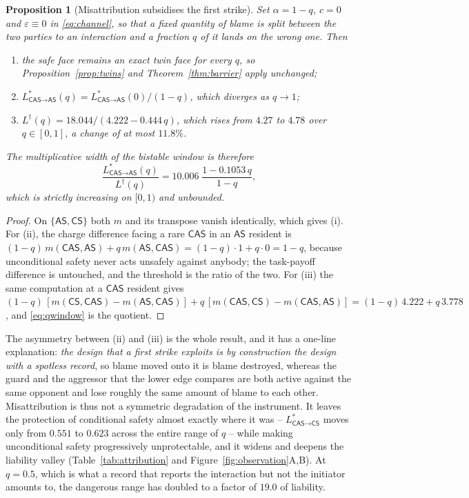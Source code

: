 \documentclass[11pt,a4paper]{article}
\newtheorem{proposition}[theorem]{Proposition}
\theoremstyle{definition}
\newcommand{\AS}{\textsf{AS}}
\newcommand{\CS}{\textsf{CS}}
\newcommand{\CAS}{\textsf{CAS}}
\begin{document}
\begin{proposition}[Misattribution subsidises the first strike]
\label{prop:misattr}
Set $\alpha=1-q$, $c=0$ and $\varepsilon\equiv0$ in \eqref{eq:channel}, so
that a fixed quantity of blame is split between the two parties to an
interaction and a fraction $q$ of it lands on the wrong one. Then
\begin{enumerate}
\item[(i)] the safe face remains an exact twin face for every $q$, so
Proposition~\ref{prop:twins} and Theorem~\ref{thm:barrier} apply unchanged;
\item[(ii)] $L^{*}_{\CAS\to\AS}(q)=L^{*}_{\CAS\to\AS}(0)/(1-q)$, which
diverges as $q\to1$;
\item[(iii)] $L^{\dagger}(q)=18.044/(4.222-0.444\,q)$, which rises from
$4.27$ to $4.78$ over $q\in[0,1]$, a change of at most $11.8\%$.
\end{enumerate}
The multiplicative width of the bistable window is therefore
\begin{equation}
\frac{L^{*}_{\CAS\to\AS}(q)}{L^{\dagger}(q)}
  =10.006\;\frac{1-0.1053\,q}{1-q},
\label{eq:qwindow}
\end{equation}
which is strictly increasing on $[0,1)$ and unbounded.
\end{proposition}

\begin{proof}
On $\{\AS,\CS\}$ both $m$ and its transpose vanish identically, which gives
(i). For (ii), the charge difference facing a rare $\CAS$ in an $\AS$ resident
is $(1-q)\,m(\CAS,\AS)+q\,m(\AS,\CAS)=(1-q)\cdot1+q\cdot0=1-q$, because
unconditional safety never acts unsafely against anybody; the task-payoff
difference is untouched, and the threshold is the ratio of the two. For (iii)
the same computation at a $\CAS$ resident gives
$(1-q)\,[m(\CS,\CAS)-m(\AS,\CAS)]+q\,[m(\CAS,\CS)-m(\CAS,\AS)]
 =(1-q)\,4.222+q\,3.778$, and \eqref{eq:qwindow} is the quotient.
\end{proof}

The asymmetry between (ii) and (iii) is the whole result, and it has a
one-line explanation: \emph{the design that a first strike exploits is by
construction the design with a spotless record}, so blame moved onto it is
blame destroyed, whereas the guard and the aggressor that the lower edge
compares are both active against the same opponent and lose roughly the same
amount of blame to each other. Misattribution is thus not a symmetric
degradation of the instrument. It leaves the protection of conditional safety
almost exactly where it was -- $L^{*}_{\CAS\to\CS}$ moves only from $0.551$ to
$0.623$ across the entire range of $q$ -- while making unconditional safety
progressively unprotectable, and it widens and deepens the liability valley
(Table~\ref{tab:attribution} and Figure~\ref{fig:observation}A,B). At $q=0.5$,
which is what a record that reports the interaction but not the initiator
amounts to, the dangerous range has doubled to a factor of $19.0$ of
liability.
\end{document}
